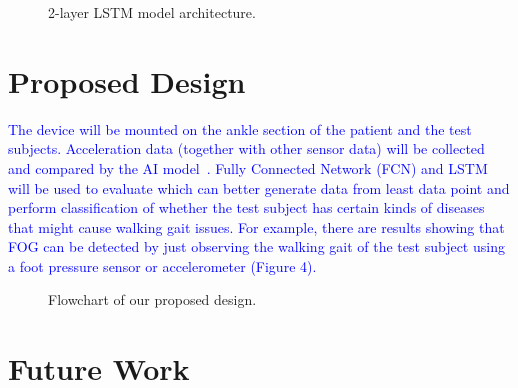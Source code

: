\documentclass[10pt,twocolumn,letterpaper]{article}
\begin{document}
\begin{figure}[t]
    \centering
    \caption{2-layer LSTM model architecture.}
    \label{fig:f3}
\end{figure}

\section{Proposed Design}
\label{sec:design}

\textcolor{blue}{
    The device will be mounted on the ankle section of the patient and the test subjects. Acceleration data (together with other sensor data) will be collected and compared by the AI model~\cite[]{10.1007/978-3-319-59147-6_30}. Fully Connected Network (FCN) and LSTM will be used to evaluate which can better generate data from least data point and perform classification of whether the test subject has certain kinds of diseases that might cause walking gait issues. For example, there are results showing that FOG can be detected by just observing the walking gait of the test subject using a foot pressure sensor or accelerometer (Figure 4).
}

\begin{figure}[t]
    \centering
    \caption{Flowchart of our proposed design.}
    \label{fig:f4}
\end{figure}

\section{Future Work}
\label{sec:future_work}
\end{document}
